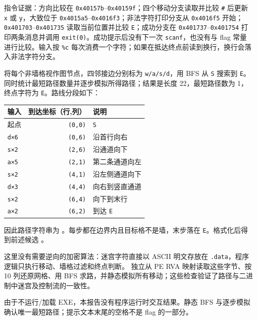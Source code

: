 指令证据：方向比较在 \texttt{0x40157b}--\texttt{0x40159f}；四个移动分支读取并比较 \texttt{\#} 后更新 \texttt{x} 或 \texttt{y}，大致位于 \texttt{0x4015a5}--\texttt{0x4016f3}；非法字符打印分支从 \texttt{0x4016f5} 开始；\texttt{0x401703}--\texttt{0x401735} 读取当前位置并比较 \texttt{E}；成功分支在 \texttt{0x401737}--\texttt{0x401754} 打印两条消息并调用 \texttt{exit(0)}。成功提示后没有下一次 \texttt{scanf}，也没有与 flag 常量进行比较。输入按 \texttt{\%c} 每次消费一个字符；如果在抵达终点前读到换行，换行会落入非法字符分支。

将每个非墙格视作图节点，四邻接边分别标为 \texttt{w/a/s/d}，用 BFS 从 \texttt{S} 搜索到 \texttt{E}。\texttt{} 同时统计最短路径数量并逐步模拟所得路径；结果是长度 22，最短路径数为 1，终点字符为 \texttt{E}。路线分段如下：

{\def\LTcaptype{} %
\begin{longtable}[]{@{}lrl@{}}
\toprule\noalign{}
输入 & 到达坐标（行,列） & 说明 \\
\midrule\noalign{}
\endhead
\bottomrule\noalign{}
\endlastfoot
起点 & \texttt{(0,0)} & \texttt{S} \\
\texttt{d×6} & \texttt{(0,6)} & 沿首行向右 \\
\texttt{s×2} & \texttt{(2,6)} & 沿通道向下 \\
\texttt{a×5} & \texttt{(2,1)} & 第二条通道向左 \\
\texttt{s×2} & \texttt{(4,1)} & 沿左侧通道向下 \\
\texttt{d×3} & \texttt{(4,4)} & 向右到竖直通道 \\
\texttt{s×2} & \texttt{(6,4)} & 向下到末行 \\
\texttt{a×2} & \texttt{(6,2)} & 到达 \texttt{E} \\
\end{longtable}
}

因此路径字符串为 \texttt{}。每步都在边界内且目标格不是墙，末步落在 \texttt{E}。格式化后得到前述候选 \texttt{}。

这里没有需要逆向的加密算法：迷宫字符直接以 ASCII 明文存放在 \texttt{.data}，程序逻辑只执行移动、墙格过滤和终点判断。\texttt{} 独立从 PE RVA 映射读取这些字节、按 10 列还原网格、用 BFS 求路，并静态模拟所有移动；这些检查验证了路径与二进制中迷宫及控制流的一致性。

由于不运行/加载 EXE，本报告没有程序运行时交互结果。静态 BFS 与逐步模拟确认唯一最短路径；提示文本末尾的空格不是 flag 的一部分。

